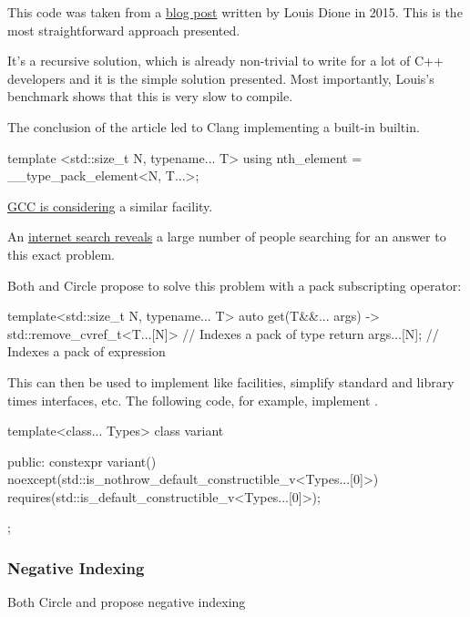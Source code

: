 \documentclass{wg21}
\begin{document}
This code was taken from a \href{https://ldionne.com/2015/11/29/efficient-parameter-pack-indexing/}{blog post} written by Louis Dione in 2015.
This is the most straightforward approach presented.

It's a recursive solution, which is already non-trivial to write for a lot of C++ developers and it is the simple solution presented.
Most importantly, Louis's benchmark shows that this is very slow to compile.

The conclusion of the article led to Clang implementing a built-in  builtin.

\begin{colorblock}
template <std::size_t N, typename... T>
using nth_element = __type_pack_element<N, T...>;
\end{colorblock}

\href{https://gcc.gnu.org/bugzilla/show_bug.cgi?id=100157}{GCC is considering} a similar facility.

An \href{https://gcc.gnu.org/bugzilla/show_bug.cgi?id=100157}{internet search reveals} a large number of people searching for an answer to this exact problem.

Both  and Circle propose to solve this problem with a pack subscripting operator:

\begin{colorblock}
template<std::size_t N, typename... T>
auto get(T&&... args) -> std::remove_cvref_t<T...[N]> // Indexes a pack of type {
    return args...[N]; // Indexes a pack of expression
}
\end{colorblock}

This can then be used to implement  like facilities, simplify standard and library times interfaces, etc.
The following code, for example, implement .

\begin{colorblock}
template<class... Types>
class variant {
public:
    constexpr variant()
    noexcept(std::is_nothrow_default_constructible_v<Types...[0]>)
    requires(std::is_default_constructible_v<Types...[0]>);

};
\end{colorblock}

\subsubsection{Negative Indexing}

Both Circle and  propose negative indexing
\end{document}
